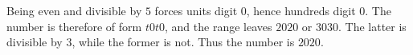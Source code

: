Being even and divisible by $5$ forces units digit $0$, hence hundreds digit $0$. The number is therefore of form $t0t0$, and the range leaves $2020$ or $3030$. The latter is divisible by $3$, while the former is not. Thus the number is $\boxed{2020}$.
